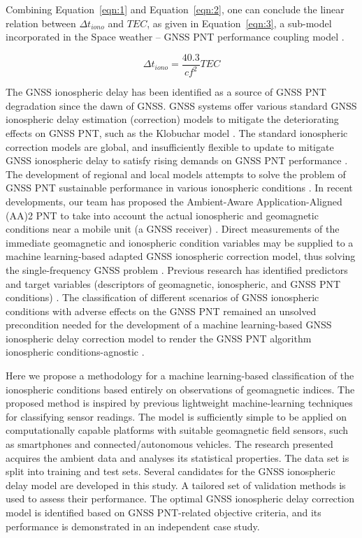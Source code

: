 \documentclass[sn-mathphys-num]{sn-jnl}%
\begin{document}
Combining Equation~\ref{eqn:1} and Equation~\ref{eqn:2}, one can conclude the linear relation between $\Delta t_{iono}$ and $TEC$, as given in Equation~\ref{eqn:3}, a sub-model incorporated in the Space weather – GNSS PNT performance coupling model \cite{filic2018modelling}.

\begin{equation}
	\Delta t_{iono} = \frac{40.3}{c f^{2}} TEC
	\label{eqn:3}
\end{equation}

The GNSS ionospheric delay has been identified as a source of GNSS PNT degradation since the dawn of GNSS. GNSS systems offer various standard GNSS ionospheric delay estimation (correction) models to mitigate the deteriorating effects on GNSS PNT, such as the Klobuchar model \cite{spilker1996global, filic2018modelling}. The standard ionospheric correction models are global, and insufficiently flexible to update to mitigate GNSS ionospheric delay to satisfy rising demands on GNSS PNT performance \cite{filjar2024ambient, filic2018modelling}. The development of regional and local models attempts to solve the problem of GNSS PNT sustainable performance in various ionospheric conditions \cite{sikirica2021risk}. In recent developments, our team has proposed the Ambient-Aware Application-Aligned (AA)2 PNT to take into account the actual ionospheric and geomagnetic conditions near a mobile unit (a GNSS receiver) \cite{filjar2022application, filic2018modelling, filjar2024ambient}. Direct measurements of the immediate geomagnetic and ionospheric condition variables may be supplied to a machine learning-based adapted GNSS ionospheric correction model, thus solving the single-frequency GNSS problem \cite{filjar2022application}. Previous research has identified predictors and target variables (descriptors of geomagnetic, ionospheric, and GNSS PNT conditions) \cite{filic2018modelling, natras2022ensemble, natras2023regional}. The classification of different scenarios of GNSS ionospheric conditions with adverse effects on the GNSS PNT remained an unsolved precondition needed for the development of a machine learning-based GNSS ionospheric delay correction model to render the GNSS PNT algorithm ionospheric conditions-agnostic \cite{filjar2022application, filjar2024ambient}.

Here we propose a methodology for a machine learning-based classification of the ionospheric conditions based entirely on observations of geomagnetic indices. The proposed method is inspired by previous lightweight machine-learning techniques \cite{filjar2020comparison} for classifying sensor readings. The model is sufficiently simple to be applied on computationally capable platforms with suitable geomagnetic field sensors, such as smartphones and connected/autonomous vehicles. The research presented acquires the ambient data and analyses its statistical properties. The data set is split into training and test sets. Several candidates for the GNSS ionospheric delay model are developed in this study. A tailored set of validation methods is used to assess their performance. The optimal GNSS ionospheric delay correction model is identified based on GNSS PNT-related objective criteria, and its performance is demonstrated in an independent case study.
\end{document}
